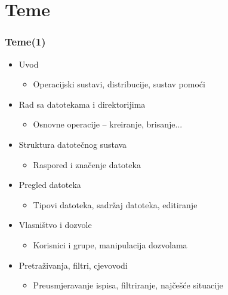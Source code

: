 \documentclass{beamer}
\begin{document}
\section{Teme}
\begin{frame}[t]
\frametitle{Teme(1)}
\begin{itemize}
	\item Uvod
	\begin{itemize}
		\item Operacijski sustavi, distribucije, sustav pomoći
	\end{itemize}
	\item Rad sa datotekama i direktorijima
	\begin{itemize}
		\item Osnovne operacije – kreiranje, brisanje...
	\end{itemize}
	\item Struktura datotečnog sustava
	\begin{itemize}
		\item Raspored i značenje datoteka
	\end{itemize}
	\item Pregled datoteka
	\begin{itemize}
		\item Tipovi datoteka, sadržaj datoteka, editiranje
	\end{itemize}
	\item Vlasništvo i dozvole
	\begin{itemize}
		\item Korisnici i grupe, manipulacija dozvolama
	\end{itemize}
	\item Pretraživanja, filtri, cjevovodi
	\begin{itemize}
		\item Preusmjeravanje ispisa, filtriranje, najčešće situacije
	\end{itemize}
\end{itemize}
\end{frame}
\end{document}
